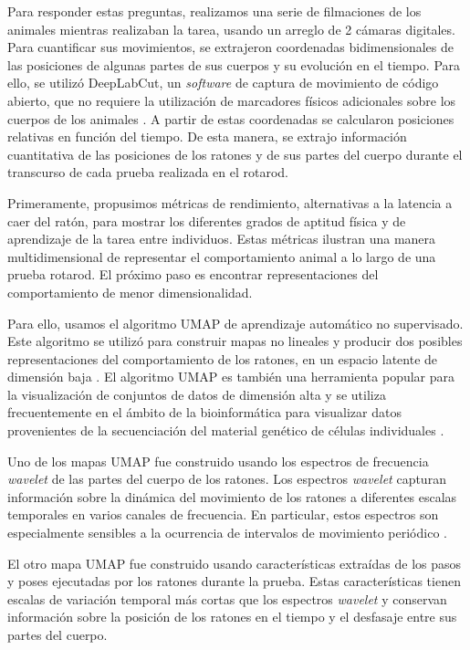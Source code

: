 Para responder estas preguntas, realizamos una serie de filmaciones de los animales mientras realizaban la tarea, usando un arreglo de 2 cámaras digitales. Para cuantificar sus movimientos, se extrajeron coordenadas bidimensionales de las posiciones de algunas partes de sus cuerpos y su evolución en el tiempo. Para ello, se utilizó DeepLabCut, un \textit{software} de captura de movimiento de código abierto, que no requiere la utilización de marcadores físicos adicionales sobre los cuerpos de los animales \cite{mathis_deeplabcut}. A partir de estas coordenadas se calcularon posiciones relativas en función del tiempo. De esta manera, se extrajo información cuantitativa de las posiciones de los ratones y de sus partes del cuerpo durante el transcurso de cada prueba realizada en el rotarod.

Primeramente, propusimos métricas de rendimiento, alternativas a la latencia a caer del ratón, para mostrar los diferentes grados de aptitud física y de aprendizaje de la tarea entre individuos. Estas métricas ilustran una manera multidimensional de representar el comportamiento animal a lo largo de una prueba rotarod. El próximo paso es encontrar representaciones del comportamiento de menor dimensionalidad.

Para ello, usamos el algoritmo UMAP de aprendizaje automático no supervisado. Este algoritmo se utilizó para construir mapas no lineales y producir dos posibles representaciones del comportamiento de los ratones, en un espacio latente de dimensión baja \cite{mcinnes_umap}. El algoritmo UMAP es también una herramienta popular para la visualización de conjuntos de datos de dimensión alta y se utiliza frecuentemente en el ámbito de la bioinformática para visualizar datos provenientes de la secuenciación del material genético de células individuales \cite{packer_umap_c_elegans}.

Uno de los mapas UMAP fue construido usando los espectros de frecuencia \textit{wavelet} de las partes del cuerpo de los ratones. Los espectros \textit{wavelet} capturan información sobre la dinámica del movimiento de los ratones a diferentes escalas temporales en varios canales de frecuencia. En particular, estos espectros son especialmente sensibles a la ocurrencia de intervalos de movimiento periódico \cite{berman_mapping}.

El otro mapa UMAP fue construido usando características extraídas de los pasos y poses ejecutadas por los ratones durante la prueba. Estas características tienen escalas de variación temporal más cortas que los espectros \textit{wavelet} y conservan información sobre la posición de los ratones en el tiempo y el desfasaje entre sus partes del cuerpo.

